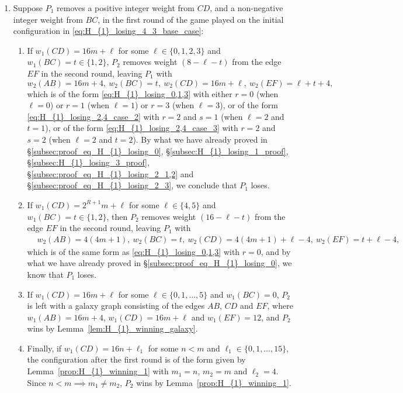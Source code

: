\documentclass[11pt,reqno]{amsart}
\theoremstyle{definition}
\theoremstyle{definition}
\begin{document}
\begin{enumerate}
\item Suppose $P_{1}$ removes a positive integer weight from $CD$, and a non-negative integer weight from $BC$, in the first round of the game played on the initial configuration in \eqref{eq:H_{1}_losing_4_3_base_case}:
\begin{enumerate}
\item If $w_{1}(CD)=16m+\ell$ for some $\ell \in \{0,1,2,3\}$ and $w_{1}(BC)=t \in \{1,2\}$, $P_{2}$ removes weight $(8-\ell-t)$ from the edge $EF$ in the second round, leaving $P_{1}$ with
\begin{equation}
w_{2}(AB)=16m+4,\ w_{2}(BC)=t,\ w_{2}(CD)=16m+\ell,\ w_{2}(EF)=\ell+t+4,\nonumber
\end{equation}
which is of the form \eqref{eq:H_{1}_losing_0,1,3} with either $r=0$ (when $\ell=0$) or $r=1$ (when $\ell=1$) or $r=3$ (when $\ell=3$), or of the form \eqref{eq:H_{1}_losing_2,4_case_2} with $r=2$ and $s=1$ (when $\ell=2$ and $t=1$), or of the form \eqref{eq:H_{1}_losing_2,4_case_3} with $r=2$ and $s=2$ (when $\ell=2$ and $t=2$). By what we have already proved in \S\ref{subsec:proof_eq_H_{1}_losing_0}, \S\ref{subsec:H_{1}_losing_1_proof}, \S\ref{subsec:H_{1}_losing_3_proof}, \S\ref{subsec:proof_eq_H_{1}_losing_2_1,2} and \S\ref{subsec:proof_eq_H_{1}_losing_2_3}, we conclude that $P_{1}$ loses.

\item If $w_{1}(CD)=2^{R+1}m+\ell$ for some $\ell \in \{4,5\}$ and $w_{1}(BC)=t \in \{1,2\}$, then $P_{2}$ removes weight $(16-\ell-t)$ from the edge $EF$ in the second round, leaving $P_{1}$ with
\begin{align}
{}&w_{2}(AB)=4(4m+1),\ w_{2}(BC)=t,\ w_{2}(CD)=4(4m+1)+\ell-4,\ w_{2}(EF)=t+\ell-4,\nonumber
\end{align}
which is of the same form as \eqref{eq:H_{1}_losing_0,1,3} with $r=0$, and by what we have already proved in \S\ref{subsec:proof_eq_H_{1}_losing_0}, we know that $P_{1}$ loses.

\item If $w_{1}(CD)=16m+\ell$ for some $\ell \in \{0,1,\ldots,5\}$ and $w_{1}(BC)=0$, $P_{2}$ is left with a galaxy graph consisting of the edges $AB$, $CD$ and $EF$, where $w_{1}(AB)=16m+4$, $w_{1}(CD)=16m+\ell$ and $w_{1}(EF)=12$, and $P_{2}$ wins by Lemma~\ref{lem:H_{1}_winning_galaxy}.

\item Finally, if $w_{1}(CD)=16n+\ell_{1}$ for some $n < m$ and $\ell_{1} \in \{0,1,\ldots,15\}$, the configuration after the first round is of the form given by Lemma~\ref{prop:H_{1}_winning_1} with $m_{1}=n$, $m_{2}=m$ and $\ell_{2}=4$. Since $n<m \implies m_{1}\neq m_{2}$, $P_{2}$ wins by Lemma~\ref{prop:H_{1}_winning_1}.
\end{enumerate}


\end{enumerate}
\end{document}
